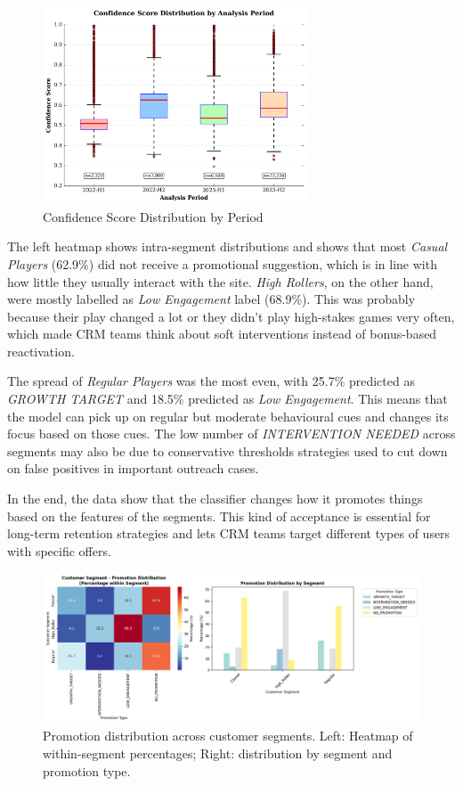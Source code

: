 \documentclass[12pt,a4paper]{report}
\begin{document}
\begin{figure}[H]
    \centering
    \includegraphics[width=0.7\textwidth]{figures/confidence_boxplot.png}
    \caption{Confidence Score Distribution by Period}
    \label{fig:confidence_boxplot}
\end{figure}


The left heatmap shows intra-segment distributions and shows that most \textit{Casual Players} (62.9\%) did not receive a promotional suggestion, which is in line with how little they usually interact with the site. \textit{High Rollers}, on the other hand, were mostly labelled as \textit{Low Engagement} label (68.9\%). This was probably because their play changed a lot or they didn't play high-stakes games very often, which made CRM teams think about soft interventions instead of bonus-based reactivation.

The spread of \textit{Regular Players} was the most even, with 25.7\% predicted as \textit{GROWTH TARGET} and 18.5\% predicted as \textit{Low Engagement}. This means that the model can pick up on regular but moderate behavioural cues and changes its focus based on those cues. The low number of \textit{INTERVENTION NEEDED} across segments may also be due to conservative thresholds strategies used to cut down on false positives in important outreach cases\cite{scikit-learn,rf_original}.

In the end, the data show that the classifier changes how it promotes things based on the features of the segments. This kind of acceptance is essential for long-term retention strategies and lets CRM teams target different types of users with specific offers.

\begin{figure}[H]
    \centering
    \includegraphics[width=1.10\textwidth]{figures/customer_segment_promotion_dist.png}
    \caption{Promotion distribution across customer segments. Left: Heatmap of within-segment percentages; Right: distribution by segment and promotion type.}
    \label{fig:segment_promo_dist}
\end{figure}
\end{document}
